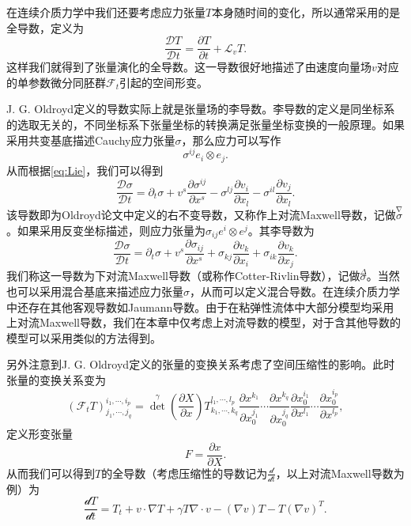 在连续介质力学中我们还要考虑应力张量$T$本身随时间的变化，所以通常采用的是全导数，定义为
\begin{equation*}
	\frac{\mathcal{D} T}{\mathcal{D}t} = \frac{\partial T}{\partial t} + \mathcal{L}_v T. 
\end{equation*}
这样我们就得到了张量演化的全导数。这一导数很好地描述了由速度向量场$v$对应的单参数微分同胚群$\mathcal{F}_t$引起的空间形变\cite{dubrovinmodern}。

J. G. Oldroyd定义的导数实际上就是张量场的李导数。李导数的定义是同坐标系的选取无关的，不同坐标系下张量坐标的转换满足张量坐标变换的一般原理。如果采用共变基底描述Cauchy应力张量$\sigma$，那么应力可以写作
\begin{equation*}{}
	\sigma^{ij} e_i \otimes e_j.
\end{equation*}
从而根据\eqref{eq:Lie}，我们可以得到
\begin{equation}
	\frac{\mathcal{D} \sigma}{\mathcal{D}t} = \partial_t \sigma + v^s \frac{\partial \sigma^{ij}}{\partial x^s} - \sigma^{lj} \frac{\partial v_i}{\partial x_l} -  \sigma^{il} \frac{\partial v_j}{\partial x_l}. 
\end{equation}
该导数即为Oldroyd论文中定义的右不变导数，又称作上对流Maxwell导数，记做$\stackrel{\nabla} \sigma$。如果采用反变坐标描述，则应力张量为$\sigma_{ij} e^i \otimes e^j$。其李导数为
\begin{equation}
	\frac{\mathcal{D} \sigma}{\mathcal{D}t} = \partial_t \sigma + v^s \frac{\partial \sigma_{ij}}{\partial x^s} + \sigma_{kj} \frac{\partial v_k}{\partial x_i} +  \sigma_{ik} \frac{\partial v_k}{\partial x_j}. 
\end{equation}
我们称这一导数为下对流Maxwell导数（或称作Cotter-Rivlin导数），记做$\stackrel{\Delta} \sigma$\cite{oldroyd1950formulation,dimitrienko2010nonlinear}。当然也可以采用混合基底来描述应力张量$\sigma$，从而可以定义混合导数。在连续介质力学中还存在其他客观导数如Jaumann导数。由于在粘弹性流体中大部分模型均采用上对流Maxwell导数，我们在本章中仅考虑上对流导数的模型，对于含其他导数的模型可以采用类似的方法得到。

另外注意到J. G. Oldroyd定义的张量的变换关系考虑了空间压缩性的影响。此时张量的变换关系变为
\begin{equation*}
	(\mathcal{F}_t T)^{i_1,\cdots,i_p}_{j_1, \cdots,j_q} = {\det}^\gamma({\frac{\partial X}{\partial x}}) T^{l_1,\cdots,l_p}_{k_1, \cdots,k_q} \frac{\partial x^{k_1}}{\partial x_0^{j_1}} \cdots \frac{\partial x^{k_q}}{\partial x_0^{j_q}} \frac{\partial x_0^{i_1}}{\partial x^{l_1}} \cdots \frac{\partial x_0^{i_p}}{\partial x^{l_p}},  
\end{equation*}
定义形变张量
\begin{equation*}
	F = \frac{\partial x}{\partial X}.
\end{equation*}
从而我们可以得到$T$的全导数（考虑压缩性的导数记为$\frac{\mathcal{d}}{\mathcal{d} t}$，以上对流Maxwell导数为例）为
\begin{equation*}
	\frac{\mathcal{d} T}{\mathcal{d} t} =  T_t +v \cdot \nabla T + \gamma T \nabla \cdot v - (\nabla v) T - T(\nabla v)^T.   
\end{equation*}

